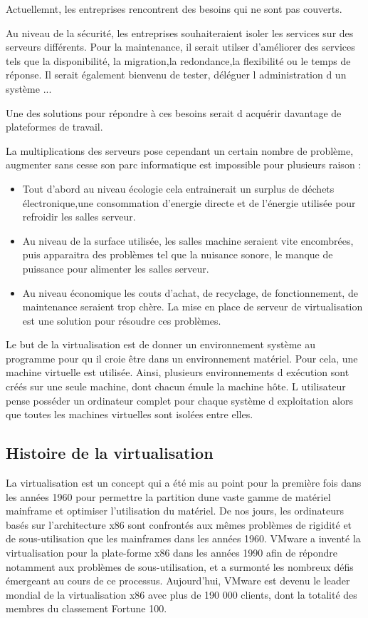 Actuellemnt, les entreprises rencontrent des besoins qui ne sont
pas couverts.

Au niveau de la sécurité, les entreprises souhaiteraient isoler les
services sur des serveurs différents. Pour la maintenance, il serait
utilser d'améliorer des services tels que la disponibilité, la migration,la redondance,la flexibilité ou le temps de réponse. Il serait également bienvenu de tester, déléguer l administration d un système ...


Une des solutions pour répondre à ces besoins serait d acquérir davantage de plateformes de travail.


La multiplications des serveurs pose cependant un certain nombre
de problème, augmenter sans cesse son parc informatique est impossible
pour plusieurs raison : 
\begin{itemize}
\item Tout d'abord au niveau écologie cela entrainerait un surplus de déchets électronique,une consommation d'energie directe et de l'énergie utilisée pour refroidir les salles serveur.
\item Au niveau de la surface utilisée, les salles machine seraient vite encombrées, puis apparaitra des problèmes tel que la nuisance sonore, le manque de puissance pour alimenter les salles serveur. 
\item Au niveau économique les couts d'achat, de recyclage, de fonctionnement, de maintenance seraient trop chère. La mise en place de serveur de virtualisation est une solution pour résoudre ces problèmes.
\end{itemize}

Le but de la virtualisation est de donner un environnement système
au programme pour qu il croie être dans un environnement
matériel. Pour cela, une machine virtuelle est utilisée. Ainsi, plusieurs
environnements d exécution sont créés sur une seule
machine, dont chacun émule la machine hôte. L utilisateur
pense posséder un ordinateur complet pour chaque système d exploitation
alors que toutes les machines virtuelles sont isolées entre elles.

\subsection{Histoire de la virtualisation}

La virtualisation est un concept qui a été mis au point pour la première
fois dans les années 1960 pour permettre la partition dune vaste gamme de matériel mainframe et optimiser l'utilisation du matériel. De nos jours, les ordinateurs basés sur l'architecture x86 sont confrontés aux mêmes problèmes de rigidité et de sous-utilisation que les mainframes dans les années 1960. VMware a inventé la virtualisation pour la plate-forme x86 dans les années 1990 afin de répondre notamment aux problèmes de sous-utilisation, et a surmonté les nombreux défis émergeant au cours de ce processus. Aujourd'hui, VMware est devenu le leader mondial de la virtualisation x86 avec plus de 190 000 clients, dont la totalité des membres du classement Fortune 100.
\newpage
